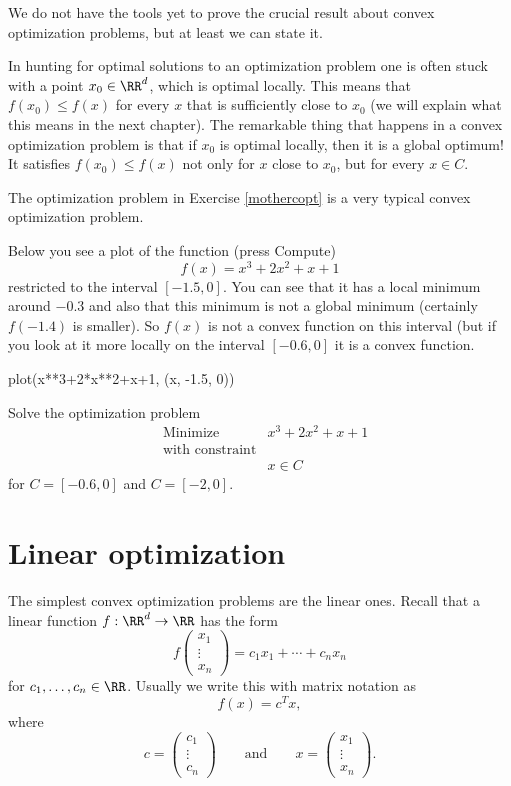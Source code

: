 \documentclass{article}
\begin{document}
    We do not have the tools yet to prove the crucial
    result about convex optimization problems, but at least we can state it.


    \begin{remark}[emph]
    In hunting for optimal solutions to an optimization problem one is often stuck with a
    point $x_0\in \RR^d$, which is optimal locally. This means that $f(x_0)\leq f(x)$ for
    every $x$ that is sufficiently close to $x_0$ (we will explain what this means in the next
    chapter). The remarkable thing that happens in a convex optimization problem is
    that if $x_0$ is optimal locally, then it is a global optimum! It satisfies
    $f(x_0)\leq f(x)$ not only for $x$ close to $x_0$, but for every $x\in C$.
\end{remark}
    
    The optimization problem in Exercise \ref{mothercopt} is a very typical convex optimization
    problem.

    Below you see a plot of the function (press Compute)
    $$
    f(x) = x^3 + 2 x^2 + x + 1
    $$
    restricted
    to the interval $[-1.5, 0]$. You can see that it has a local minimum around $-0.3$ and
    also that this minimum is not a global minimum (certainly $f(-1.4)$ is smaller). So $f(x)$
    is not a convex function on this interval (but if you look at it more locally on the
    interval $[-0.6, 0]$ it is a convex function.
    
    \begin{sage}
      plot(x**3+2*x**2+x+1, (x, -1.5, 0))
    \end{sage}

    \beginshex
    Solve the optimization problem
    \begin{align*}
    &\text{Minimize} &x^3 + 2 x^2 + x + 1\\
    &\text{with constraint}\\
      &&x\in C
    \end{align*}
    for $C = [-0.6, 0]$ and $C = [-2, 0]$.
    \endshex
    
  \section{Linear optimization}

  The simplest convex optimization problems are the linear ones. Recall that a
  linear function $f: \RR^d\rightarrow \RR$ has the form
  $$
  f\begin{pmatrix} x_1 \\ \vdots \\ x_n \end{pmatrix} =
  c_1 x_1 + \cdots + c_n x_n
  $$
  for $c_1, \dots, c_n\in \RR$. Usually we write this with matrix notation as
  $$
  f(x) = c^T x,
  $$
  where
  $$
  c =
  \begin{pmatrix} c_1 \\ \vdots \\ c_n \end{pmatrix}\qquad \text{and} \qquad
  x = \begin{pmatrix} x_1 \\ \vdots \\ x_n \end{pmatrix}.
  $$
\end{document}
